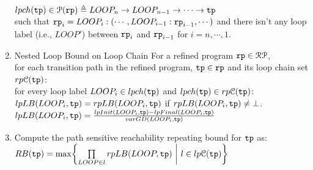 \begin{enumerate}
\\
$lpch(\mathtt{tp}) \in \mathcal{P}(\mathtt{rp}) \triangleq 
LOOP_n \to LOOP_{n-1} \to \cdots \to \mathtt{tp}$
\\
such that 
$\mathtt{rp}_{i}= LOOP_i : (\cdots, LOOP_{i - 1} : \mathtt{rp}_{i-1}, \cdots)$ and
 there isn't any loop label (i.e., $LOOP'$) between $\mathtt{rp}_{i}$ and $\mathtt{rp}_{i - 1}$ for $i = n, \cdots, 1$.
\item  {Nested Loop Bound on Loop Chain}
For a refined program $\mathtt{rp} \in \mathcal{RP}$, 
\\
for each transition path in the refined program, $\mathtt{tp} \in \mathtt{rp}$ and its loop chain set $rp\mathcal{C}(\mathtt{tp})$:
\\
for every loop label $LOOP_i \in lpch(\mathtt{tp}) $ and $lpch(\mathtt{tp})  \in rp\mathcal{C}(\mathtt{tp})$:
\\
$lpLB(LOOP_i, \mathtt{tp}) = rpLB(LOOP_i, \mathtt{tp})$ if $rpLB(LOOP_i, \mathtt{tp}) \neq \bot$.
\\
$lpLB(LOOP_i, \mathtt{tp}) = 
\frac{lpInit(LOOP_i, \mathtt{tp}) - lpFinal(LOOP_i, \mathtt{tp})}{varGD(LOOP_i, \mathtt{tp})}$
\item 
Compute the path sensitive reachability repeating bound for $\mathtt{tp}$ as:
\\
$RB(\tpath) = \max
\left \{ \prod\limits_{LOOP \in l} rpLB(LOOP, \tpath)
~ \middle\vert~ l \in lp\mathcal{C}(\tpath) \right\}$
\end{enumerate}
